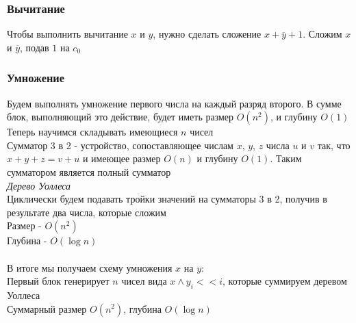 \documentclass[12pt]{article}
\begin{document}
\subsubsection{Вычитание}
Чтобы выполнить вычитание $x$ и $y$, нужно сделать сложение $x+\overline{y}+1$. Сложим $x$ и $\overline{y}$, подав $1$ на $c_0$ 
\subsubsection{Умножение}
Будем выполнять умножение первого числа на каждый разряд второго. В сумме блок, выполняющий это действие, будет иметь
размер $O(n^2)$, и глубину $O(1)$\\
Теперь научимся складывать имеющиеся $n$ чисел\\
Сумматор 3 в 2 - устройство, сопоставляющее числам $x$, $y$, $z$ числа $u$ и $v$ так, что $x+y+z=v+u$ и имеющее размер $O(n)$ и глубину $O(1)$. Таким сумматором является полный сумматор\\
\textit{Дерево Уоллеса}\\
Циклически будем подавать тройки значений на сумматоры 3 в 2, получив в результате два числа, которые сложим\\
Размер - $O(n^2)$\\
Глубина - $O(\log n)$\\\\
В итоге мы получаем схему умножения $x$ на $y$:\\
Первый блок генерирует $n$ чисел вида $x \land y_i << i$, которые суммируем деревом Уоллеса\\
Суммарный размер $O(n^2)$, глубина $O(\log n)$
\end{document}
